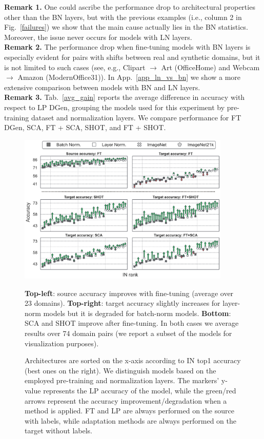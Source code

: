 \documentclass{article}
\begin{document}
\textbf{Remark 1.} One could ascribe the performance drop 
to architectural properties other than the BN layers, but with the previous examples (i.e., column 2 in Fig.~\ref{failures}) we show that the main cause actually lies in the BN statistics. 
Moreover, the issue never occurs for models with LN layers.\\
\textbf{Remark 2.} The performance drop when fine-tuning models with BN layers is especially evident for pairs with shifts between real and synthetic domains,  but it is not limited to such cases (see, e.g., Clipart $\to$ Art (OfficeHome) and Webcam $\to$ Amazon (ModernOffice31)). 
In App.~\ref{app_ln_vs_bn} we show a more extensive comparison between models with BN and LN layers.\\
\textbf{Remark 3.} Tab.~\ref{avg_gain} reports the average difference in accuracy  with respect to LP DGen, grouping the models used for this experiment by pre-training dataset and normalization layers. 
We compare performance for FT DGen, SCA, FT + SCA, SHOT, and FT + SHOT.
\begin{figure}[h!]
\begin{center}
\includegraphics[width=0.9\textwidth]{images/bars_finetuning_7.png}
\end{center}
\caption{Architectures are sorted on the x-axis according to IN top1 accuracy (best ones on the right). We distinguish models based on the employed pre-training and normalization layers. The markers' y-value
represents the LP accuracy of the model, while the green/red arrows represent the accuracy improvement/degradation  when a method is applied. 
FT and LP are always performed on the source with labels, while adaptation methods are always performed on the target without labels.} \textbf{Top-left}: 
source accuracy
improves with fine-tuning (average over 23 domains). \textbf{Top-right}:
target accuracy slightly increases for layer-norm models but it is degraded for batch-norm models. \textbf{Bottom}: SCA and SHOT improve after fine-tuning. In both cases we average results over 74 domain pairs (we report a subset of the models for visualization purposes).
\label{bars_ft}
\vspace{-0.3cm}
\end{figure}
\end{document}
